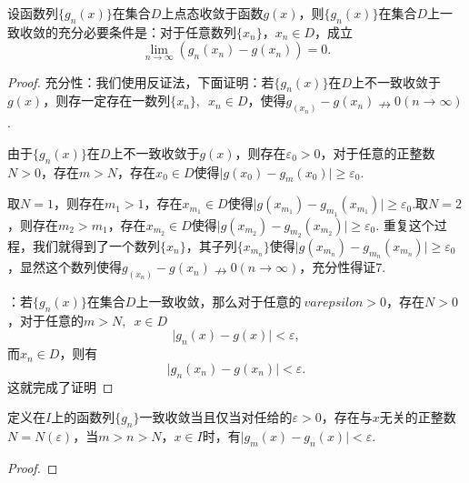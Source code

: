     \begin{theorem}
        设函数列\(\{g_n(x)\}\)在集合\(D\)上点态收敛于函数\(g(x)\)，则\(\{g_n(x)\}\)在集合\(D\)上一致收敛的充分必要条件是：对于任意数列\(\{x_n\}\)，\enspace\(x_n\in D\)，成立\[\lim_{n\to \infty}(g_n(x_n)-g(x_n))=0.\]
    \end{theorem}
    \begin{proof}
        {\heiti 充分性}：我们使用反证法，下面证明：若\(\{g_n(x)\}\)在\(D\)上不一致收敛于\(g(x)\)，则存一定存在一数列\(\{x_n\},\enspace x_n\in D\)，使得\(g_(x_n)-g(x_n)\nrightarrow0(n\to\infty)\).
    
        由于\(\{g_n(x)\}\)在\(D\)上不一致收敛于\(g(x)\)，则存在\(\varepsilon_0>0\)，对于任意的正整数\(N>0\)，存在\(m>N\)，存在\(x_0\in D\)使得\(\lvert g(x_0)-g_m(x_0)\rvert\geq\varepsilon_0\).
        
        取\(N=1\)，则存在\(m_1>1\)，存在\(x_{m_1}\in D\)使得\(\lvert g(x_{m_1})-g_{m_1}(x_{m_1})\rvert\geq\varepsilon_0\).取\(N=2\)，则存在\(m_2>m_1\)，存在\(x_{m_2}\in D\)使得\(\lvert g(x_{m_2})-g_{m_2}(x_{m_2})\rvert\geq\varepsilon_0\).
        重复这个过程，我们就得到了一个数列\(\{x_n\}\)，其子列\(\{x_{m_n}\}\)使得\(\lvert g(x_{m_n})-g_{m_n}(x_{m_n})\rvert\geq\varepsilon_0\)，显然这个数列使得\(g_(x_n)-g(x_n)\nrightarrow0(n\to\infty)\)，充分性得证7.

        ：若\(\{g_n(x)\}\)在集合\(D\)上一致收敛，那么对于任意的\(\
        varepsilon>0\)，存在\(N>0\)，对于任意的\(m>N,\enspace x\in D\)\[\lvert g_n(x)-g(x)\rvert<\varepsilon,\]
        而\(x_n\in D\)，则有\[\lvert g_n(x_n)-g(x_n)\rvert <\varepsilon.\]这就完成了证明
    \end{proof}


    \begin{theorem}[Cauchy准则]
        定义在\(I\)上的函数列\(\{g_n\}\)一致收敛当且仅当对任给的\(\varepsilon>0\)，存在与\(x\)无关的正整数\(N = N(\varepsilon)\)，当\(m>n>N\)，\enspace\(x\in I\)时，有\(\vert g_m(x)-g_n(x)\vert<\varepsilon.\)    
    \end{theorem}
    \begin{proof}
        
    \end{proof}

